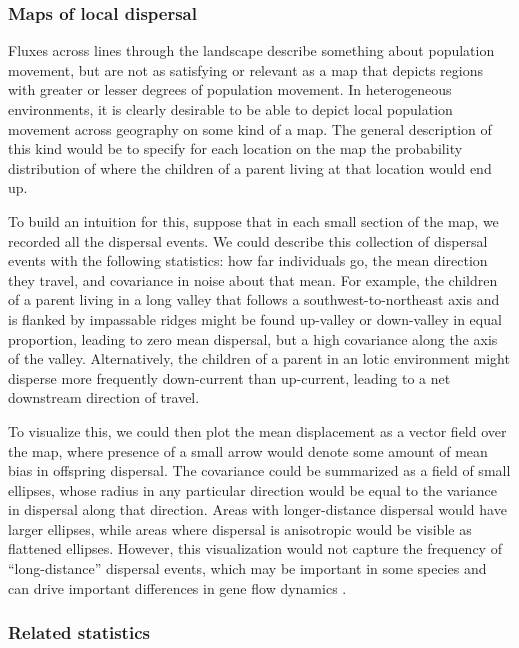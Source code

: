 \documentclass{ar-1col}
\newcommand{\g}[1]{{\color{blue}{#1}}}
\newcommand{\todo}[1]{{\textbf{\color{red}{#1}}}}
\begin{document}
\todo{tidy and conclude}

\subsubsection{Maps of local dispersal}


Fluxes across lines through the landscape
describe something about population movement,
but are not as satisfying or relevant
as a map that depicts regions with greater or lesser degrees of population movement.
In heterogeneous environments,
it is clearly desirable to be able to depict local population movement 
across geography on some kind of a map.
The general description of this kind would be 
to specify for each location on the map
the probability distribution of where 
the children of a parent living at that location would end up.

To build an intuition for this,
suppose that in each small section of the map,
we recorded all the dispersal events.
We could describe this collection of dispersal events 
with the following statistics:
how far individuals go,
the mean direction they travel,
and covariance in noise about that mean.
For example, the children of a parent 
living in a long valley that follows a southwest-to-northeast axis 
and is flanked by impassable ridges might be found up-valley 
or down-valley in equal proportion, 
leading to zero mean dispersal,
but a high covariance along the axis of the valley.
Alternatively, the children of a parent in an lotic environment 
\g{remember, we're in the pocket of Big Dictionary!}
might disperse more frequently down-current than up-current, 
leading to a net downstream direction of travel.

To visualize this,
we could then plot the mean displacement as a vector field over the map,
where presence of a small arrow would denote some amount of mean bias in offspring dispersal.
The covariance could be summarized as a field of small ellipses,
whose radius in any particular direction would be equal to the variance in dispersal
along that direction.
Areas with longer-distance dispersal would have larger ellipses,
while areas where dispersal is anisotropic would be visible as flattened ellipses.
However, this visualization would not capture the frequency of ``long-distance'' dispersal events,
which may be important in some species \citep{levin_et_al_seed_dispersal}
and can drive important differences in gene flow dynamics \citep{HallatschekFisher2014}.

\subsubsection{Related statistics}
\end{document}
